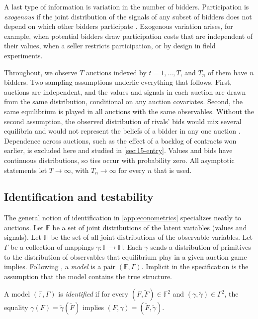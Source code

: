 A last type of information is variation in the number of bidders. Participation is \emph{exogenous} if the joint
distribution of the signals of any subset of bidders does not depend on which other bidders participate
\citep[p.~2113]{AtheyHaile2002}. Exogenous variation arises, for example, when potential bidders draw
participation costs that are independent of their values, when a seller restricts participation, or by design in
field experiments.

Throughout, we observe $T$ auctions indexed by $t=1,\dots,T$, and $T_n$ of them have $n$ bidders. Two sampling
assumptions underlie everything that follows. First, auctions are independent, and the values and signals in each
auction are drawn from the same distribution, conditional on any auction covariates. Second, the same equilibrium
is played in all auctions with the same observables. Without the second assumption, the observed distribution of
rivals' bids would mix several equilibria and would not represent the beliefs of a bidder in any one auction
\citep[footnote~18]{AtheyHaile2007}. Dependence across auctions, such as the effect of a backlog of contracts won
earlier, is excluded here and studied in \cref{sec:15-entry}. Values and bids have continuous distributions, so
ties occur with probability zero. All asymptotic statements let $T\to\infty$, with $T_n\to\infty$ for every $n$ that
is used.

\subsection{Identification and testability}\label{sec:15-identification}

The general notion of identification in \cref{app:econometrics} specializes neatly to auctions. Let $\mathbb F$ be a
set of joint distributions of the latent variables (values and signals). Let $\mathbb H$ be the set of all joint
distributions of the observable variables. Let $\Gamma$ be a collection of mappings $\gamma:\mathbb F\to\mathbb H$.
Each $\gamma$ sends a distribution of primitives to the distribution of observables that equilibrium play in a
given auction game implies. Following \citet[p.~2114]{AtheyHaile2002}, a \emph{model} is a pair $(\mathbb
F,\Gamma)$. Implicit in the specification is the assumption that the model contains the true structure.

\begin{definition}\label{def:15-identified}
A model $(\mathbb F,\Gamma)$ is \emph{identified} if for every $(F,\tilde F)\in\mathbb F^2$ and
$(\gamma,\tilde\gamma)\in\Gamma^2$, the equality $\gamma(F)=\tilde\gamma(\tilde F)$ implies
$(F,\gamma)=(\tilde F,\tilde\gamma)$.
\end{definition}

